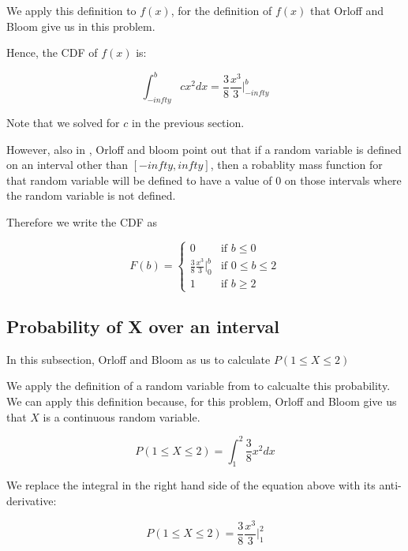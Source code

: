 \documentclass[a4paper,11pt]{article}
\begin{document}
We apply this definition to $f\left( x \right)$, for the definition of
$f\left( x \right)$ that Orloff and Bloom give us in this problem.

Hence, the CDF of $f \left( x \right)$ is:

\begin{equation}
    \int_{-infty}^{b} c x^{2} dx
      = \frac{3}{8} \frac{x^{3}}{3} \bigg\rvert_{-infty}^{b}
\end{equation}

Note that we solved for $c$ in the previous section.

However, also in \cite{reading5b}, Orloff and bloom point out that if a random
variable is defined on an interval other than $\left[-infty, infty \right]$,
then a robablity mass function for that random variable will be defined to
have a value of $0$ on those intervals where the random variable is not
defined.

Therefore we write the CDF as

\[
F \left( b \right) =
\begin{cases}
  0 & \text{if } b \leq 0 \\
   \frac{3}{8} \frac{x^{3}}{3} \bigg\rvert_{0}^{b}
    & \text{if } 0 \leq b \leq 2 \\
   1 & \text{if } b \geq 2
\end{cases}
\]
\subsection{Probability of X over an interval}

In this subsection, Orloff and Bloom as us to calculate
$P \left( 1 \leq X \leq 2 \right)$

We apply the definition of a random variable from \cite{reading5b} to calcualte
this probability. We can apply this definition because, for this problem,
Orloff and Bloom give us that $X$ is a continuous random variable.

\begin{equation}
P \left( 1 \leq X \leq 2 \right) = \int_{1}^{2} \frac{3}{8} x^{2} dx
\end{equation}

We replace the integral in the right hand side of the equation above with its
anti-derivative:

\begin{equation}
P \left( 1 \leq X \leq 2 \right) = \frac{3}{8} \frac{x^{3}}{3} \bigg\rvert_{1}^{2}
\end{equation}
\end{document}
